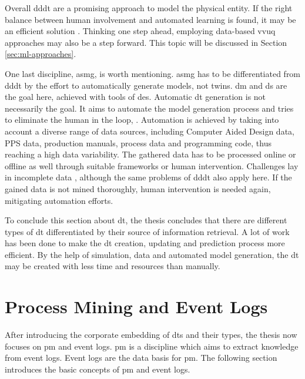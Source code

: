 Overall \gls{dddt} are a promising approach to model the physical entity. If the right balance between human involvement and automated learning is found, it may be an efficient solution \autocite{francis2021towards}. Thinking one step ahead, employing data-based \gls{vvuq} approaches may also be a step forward. This topic will be discussed in Section \autoref{sec:ml-approaches}.

\label{par:asmg}
One last discipline, \gls{asmg}, is worth mentioning. \gls{asmg} has to be differentiated from \gls{dddt} by the effort to automatically generate models, not twins. \gls{dm} and \gls{ds} are the goal here, achieved with tools of \gls{des}. Automatic \gls{dt} generation is not necessarily the goal. It aims to automate the model generation process and tries to eliminate the human in the loop, \autocite{reinhardt2019survey,lechevalier2018methodology}. Automation is achieved by taking into account a diverse range of data sources, including Computer Aided Design data, PPS data, production manuals, process data and programming code, thus reaching a high data variability. The gathered data has to be processed online or offline as well through suitable frameworks or human intervention. Challenges lay in incomplete data \autocite{bergmann2014automatische}, although the same problems of \gls{dddt} also apply here. If the gained data is not mined thoroughly, human intervention is needed again, mitigating automation efforts.

To conclude this section about \gls{dt}, the thesis concludes that there are different types of \gls{dt} differentiated by their source of information retrieval. A lot of work has been done to make the \gls{dt} creation, updating and prediction process more efficient. By the help of simulation, data and automated model generation, the \gls{dt} may be created with less time and resources than manually.

\section{Process Mining and Event Logs}
\label{sec:process-mining}
After introducing the corporate embedding of \gls{dt}s and their types, the thesis now focuses on \gls{pm} and event logs. \gls{pm} is a discipline which aims to extract knowledge from event logs. Event logs are the data basis for \gls{pm}. The following section introduces the basic concepts of \gls{pm} and event logs.

